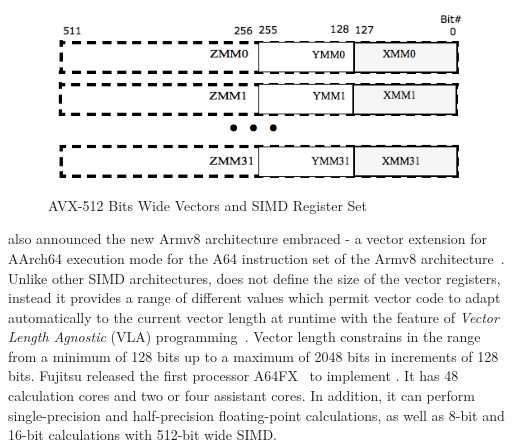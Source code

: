 \documentclass[conference]{IEEEtran}
\begin{document}
\begin{figure}[h]
    \centering
    \includegraphics[width=\linewidth]{avx_mms.png}
    \caption{AVX-512 Bits Wide Vectors and SIMD Register Set}
    \label{fig:avx_mms}
\end{figure}

\arm also announced the new Armv8 architecture embraced \sve - a vector extension for AArch64
execution mode for the A64 instruction set of the
Armv8 architecture~\cite{arm-v8-ref, ARMv8-Architecture}.
Unlike other SIMD architectures, \sve does not define the size of
the vector registers, instead it provides a range of different values which permit vector
code to adapt automatically to the current vector length at runtime with the
feature of \emph{Vector Length Agnostic} (VLA) programming~\cite{Advanced-SIMD,vla-stencil}.
Vector length constrains in the range from a minimum of 128 bits up to
a maximum of 2048 bits in increments of 128 bits. Fujitsu released the first processor A64FX~\cite{fujitsugit}
to implement \sve. It has 48 calculation cores and two or four assistant cores. In addition, it can
perform single-precision and half-precision floating-point calculations, as well as 8-bit and
16-bit calculations with 512-bit wide SIMD.
\end{document}
